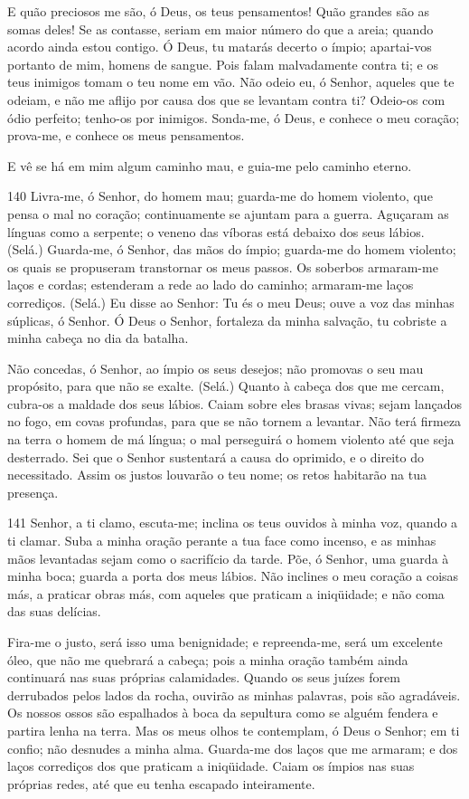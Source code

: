 E quão preciosos me são, ó Deus, os teus pensamentos! Quão
grandes são as somas deles! Se as contasse, seriam em maior
número do que a areia; quando acordo ainda estou contigo. Ó
Deus, tu matarás decerto o ímpio; apartai-vos portanto de mim,
homens de sangue. Pois falam malvadamente contra ti; e os
teus inimigos tomam o teu nome em vão. Não odeio eu, ó
Senhor, aqueles que te odeiam, e não me aflijo por causa dos que se
levantam contra ti? Odeio-os com ódio perfeito; tenho-os por
inimigos. Sonda-me, ó Deus, e conhece o meu coração;
prova-me, e conhece os meus pensamentos.

E vê se há em mim algum caminho mau, e guia-me pelo caminho
eterno.

\bigskip

\lettrine{140}{} Livra-me, ó Senhor, do homem mau; guarda-me do
homem violento, que pensa o mal no coração; continuamente se
ajuntam para a guerra. Aguçaram as línguas como a serpente; o
veneno das víboras está debaixo dos seus lábios. (Selá.)
Guarda-me, ó Senhor, das mãos do ímpio; guarda-me do homem
violento; os quais se propuseram transtornar os meus passos. Os
soberbos armaram-me laços e cordas; estenderam a rede ao lado do
caminho; armaram-me laços corrediços. (Selá.) Eu disse ao
Senhor: Tu és o meu Deus; ouve a voz das minhas súplicas, ó Senhor.
Ó Deus o Senhor, fortaleza da minha salvação, tu cobriste a
minha cabeça no dia da batalha.

Não concedas, ó Senhor, ao ímpio os seus desejos; não promovas o
seu mau propósito, para que não se exalte. (Selá.) Quanto à
cabeça dos que me cercam, cubra-os a maldade dos seus lábios.
Caiam sobre eles brasas vivas; sejam lançados no fogo, em
covas profundas, para que se não tornem a levantar. Não terá
firmeza na terra o homem de má língua; o mal perseguirá o homem
violento até que seja desterrado. Sei que o Senhor sustentará
a causa do oprimido, e o direito do necessitado. Assim os
justos louvarão o teu nome; os retos habitarão na tua presença.

\bigskip

\lettrine{141}{} Senhor, a ti clamo, escuta-me; inclina os teus
ouvidos à minha voz, quando a ti clamar. Suba a minha oração
perante a tua face como incenso, e as minhas mãos levantadas sejam
como o sacrifício da tarde. Põe, ó Senhor, uma guarda à minha
boca; guarda a porta dos meus lábios. Não inclines o meu coração
a coisas más, a praticar obras más, com aqueles que praticam a
iniqüidade; e não coma das suas delícias.

Fira-me o justo, será isso uma benignidade; e repreenda-me, será
um excelente óleo, que não me quebrará a cabeça; pois a minha oração
também ainda continuará nas suas próprias calamidades. Quando os
seus juízes forem derrubados pelos lados da rocha, ouvirão as minhas
palavras, pois são agradáveis. Os nossos ossos são espalhados à
boca da sepultura como se alguém fendera e partira lenha na terra.
Mas os meus olhos te contemplam, ó Deus o Senhor; em ti confio;
não desnudes a minha alma. Guarda-me dos laços que me armaram; e
dos laços corrediços dos que praticam a iniqüidade. Caiam os
ímpios nas suas próprias redes, até que eu tenha escapado
inteiramente.

